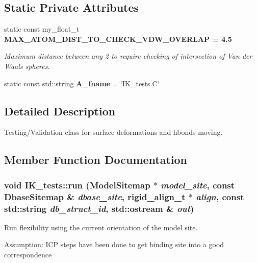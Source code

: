 \subsection*{Static Private Attributes}
\begin{CompactItemize}
\item 
static const my\_\-float\_\-t \bf{MAX\_\-ATOM\_\-DIST\_\-TO\_\-CHECK\_\-VDW\_\-OVERLAP} = 4.5\label{classASCbase_1_1IK__tests_229bfd4bf67a0a8a73322015a0307c22}

\begin{CompactList}\small\item\em Maximum distance between any 2 to require checking of intersection of Van der Waals spheres. \item\end{CompactList}\item 
static const std::string \textbf{A\_\-fname} = \char`\"{}IK\_\-tests.C\char`\"{}\label{classASCbase_1_1IK__tests_2f41807950842f871a832e69ae666921}

\end{CompactItemize}


\subsection{Detailed Description}
Testing/Validation class for surface deformations and hbonds moving. 



\subsection{Member Function Documentation}
\subsubsection{\setlength{\rightskip}{0pt plus 5cm}void IK\_\-tests::run (\bf{Model\-Sitemap} $\ast$ {\em model\_\-site}, const \bf{Dbase\-Sitemap} \& {\em dbase\_\-site}, \bf{rigid\_\-align\_\-t} $\ast$ {\em align}, const std::string {\em db\_\-struct\_\-id}, std::ostream \& {\em out})}\label{classASCbase_1_1IK__tests_fac5e4fb00a62ec37cc72f53ebb20cfd}


Run flexibility using the current orientation of the model site. 

Assumption: ICP steps have been done to get binding site into a good correspondence 

